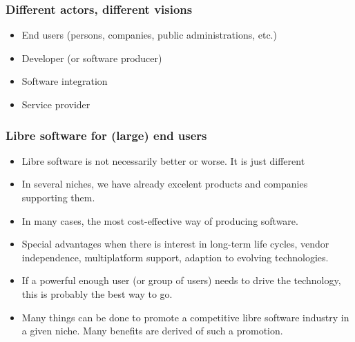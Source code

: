 
\begin{frame}
\frametitle{Different actors, different visions}

\begin{itemize}
\item End users (persons, companies, public administrations, etc.)
\item Developer (or software producer)
\item Software integration
\item Service provider
\end{itemize}

\end{frame}



\begin{frame}
\frametitle{Libre software for (large) end users}

\begin{itemize}
\item Libre software is not necessarily better or worse. It is 
  just different
\item In several niches, we have already excelent products and
  companies supporting them.
\item In many cases, the most cost-effective way of producing
  software.
\item Special advantages when there is interest in long-term life
  cycles, vendor independence, multiplatform support, adaption to
  evolving technologies.
\item If a powerful enough user (or group of users) needs to drive the
  technology, this is probably the best way to go.
\item Many things can be done to promote a competitive
  libre software industry in a given niche. Many benefits
  are derived of such a promotion.
\end{itemize}
\end{frame}


